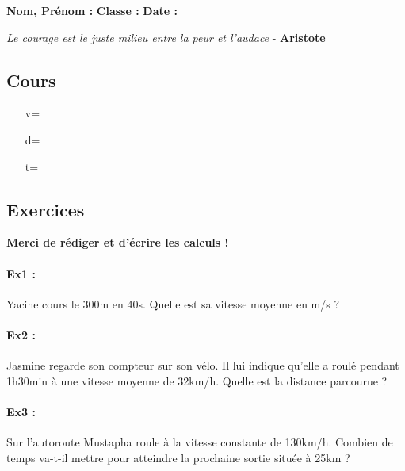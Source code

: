 



\textbf{Nom, Prénom :} \hspace{8cm} \textbf{Classe :} \hspace{3cm} \textbf{Date :}\\

\begin{center}
  \textit{Le courage est le juste milieu entre la peur et l'audace}  - \textbf{Aristote}
\end{center}

\subsection*{Cours}

\begin{multicols}{3}
  \begin{enumerate}
  \item[v=] \dotfill 
  \item[d=] \dotfill
  \item[t=] \dotfill 
  \end{enumerate}
\end{multicols}

\subsection*{Exercices}
\textbf{Merci de rédiger et d'écrire les calculs !}

\paragraph{\textbf{Ex1 : }} Yacine cours le 300m en 40s. Quelle est sa vitesse moyenne en m/s ?
\newline \Pointilles[5]

\paragraph{\textbf{Ex2 : }} Jasmine regarde son compteur sur son vélo. Il lui indique qu'elle a roulé pendant 1h30min à une vitesse moyenne de 32km/h. Quelle est la distance parcourue ?
\newline \Pointilles[5]

\paragraph{\textbf{Ex3 : }} Sur l'autoroute Mustapha roule à la vitesse constante de 130km/h. Combien de temps va-t-il mettre pour atteindre la prochaine sortie située à 25km ?
\newline \Pointilles[5]

